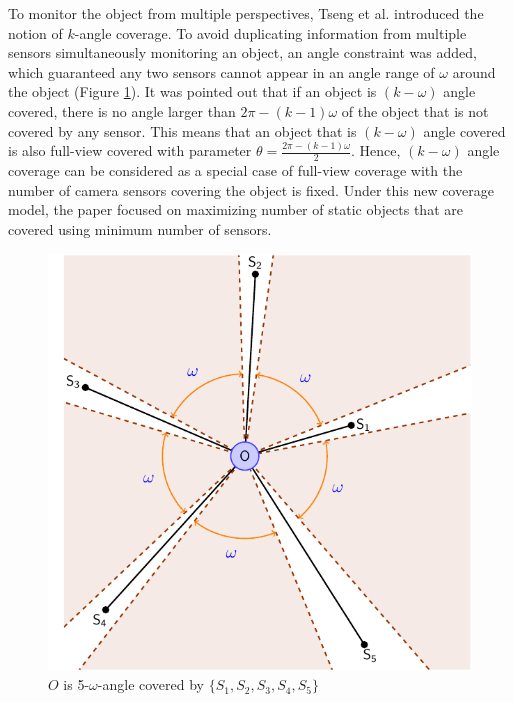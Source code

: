 To monitor the object from multiple perspectives, Tseng et al. \cite{tseng2012k} introduced the notion of $k$-angle coverage. To avoid duplicating information from multiple sensors simultaneously monitoring an object, an angle constraint was added, which guaranteed  any two sensors cannot appear in an angle range of $\omega$ around the object (Figure \ref{fig:02}). It was pointed out that if an object is $(k-\omega)$ angle covered, there is no angle larger than $2\pi-(k-1)\omega$ of the object that is not covered by any sensor. This means that an object that is $(k-\omega)$ angle covered is also full-view covered with parameter $\theta=\displaystyle\frac{2\pi-(k-1)\omega}{2}$. Hence, $(k-\omega)$ angle coverage can be considered as a special case of full-view coverage with the number of camera sensors covering the object is fixed. Under this new coverage model, the paper focused on maximizing number of static objects that are covered using minimum number of sensors.
\begin{figure}[!h]
	\centering
	\includegraphics[scale=0.6]{komega.pdf}
	\caption{$O$ is 5-$\omega$-angle covered by $\{S_1, S_2, S_3, S_4, S_5\}$}
	\label{fig:02}
\end{figure}

